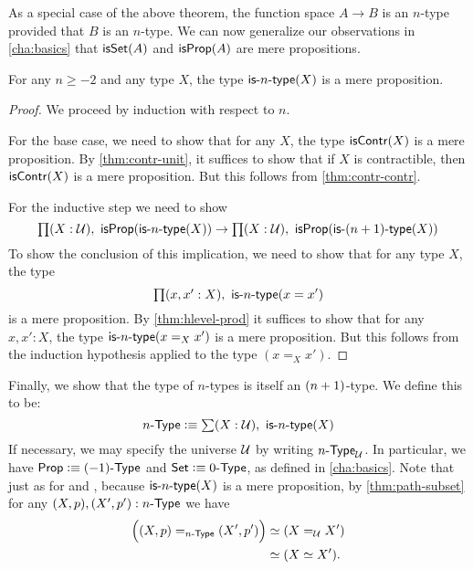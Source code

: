 As a special case of the above theorem, the function space $A \to B$ is an $n$-type provided that $B$ is an $n$-type.
We can now generalize our observations in \autoref{cha:basics} that $\isset(A)$ and $\isprop(A)$ are mere propositions.

\begin{thm}\label{thm:isaprop-isofhlevel}
 For any $n \geq -2$ and any type $X$, the type $\istype{n}(X)$ is a mere proposition.
\end{thm}
\begin{proof}
  We proceed by induction with respect to $n$.

 For the base case, we need to show that for any $X$, the type $\iscontr(X)$ is a mere proposition.
 By \autoref{thm:contr-unit}, it suffices to show that if $X$ is contractible, then $\iscontr(X)$ is a mere proposition.
 But this follows from \autoref{thm:contr-contr}.

For the inductive step we need to show
\[\prd{X : \type} \isprop (\istype{n}(X)) \to \prd{X : \type} \isprop (\istype{\nplusone}(X)) \]
To show the conclusion of this implication, we need to show that for any type $X$, the type
\[\prd{x, x' : X}\istype{n}(x = x')\]
is a mere proposition. By \autoref{thm:hlevel-prod} it suffices to show that for any $x, x' : X$, the type $\istype{n}(x =_X x')$ is a mere
proposition.
But this follows from the induction hypothesis applied to the type $(x =_X x')$.
\end{proof}

Finally, we show that the type of $n$-types is itself an $\nplusone$-type.
We define this to be:
\[\ntype{n} \defeq \sm{X : \type} \istype{n}(X) \]
If necessary, we may specify the universe $\UU$ by writing $\ntype{n}_\UU$.
In particular, we have $\prop \defeq \ntype{(-1)}$ and $\set \defeq \ntype{0}$, as defined in \autoref{cha:basics}.
Note that just as for \prop and \set, because $\istype{n}(X)$ is a mere proposition, by \autoref{thm:path-subset} for any $(X,p), (X',p'):\ntype{n}$ we have
\begin{align*}
  \Big(\id[\ntype{n}]{(X, p)}{(X', p')}\Big) &\simeq (\id[\type] X X')\\
  &\simeq (\eqv{X}{X'}).
\end{align*}

